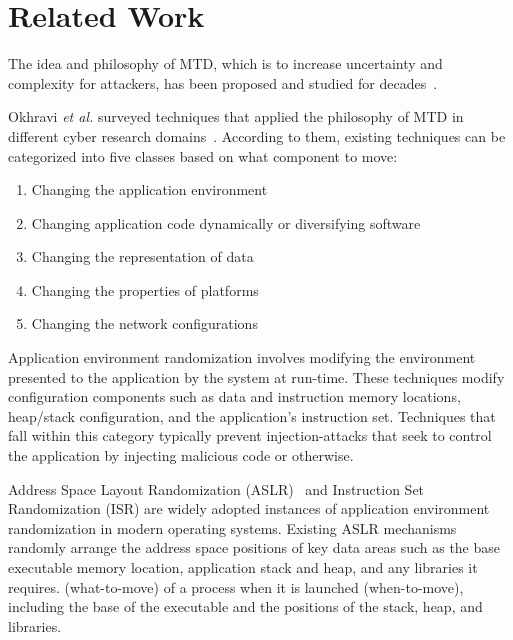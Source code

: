 \section{Related Work }
The idea and philosophy of MTD, which is to increase uncertainty and complexity for attackers, has been proposed and studied for decades~\cite{avizienis1977implementation,ammann1988data,pettis1990profile,forrest1997building}.

Okhravi \textit{et al.} surveyed techniques that applied the philosophy of MTD in different cyber research domains~\cite{okhravi2013survey}.
According to them, existing techniques can be categorized into five classes based on what component to move:
\begin{enumerate}
	\item Changing the application environment~\cite{team2003pax,barrantes2003randomized}
	\item Changing application code dynamically or diversifying software~\cite{wartell2012binary,larsen2014sok}
	\item Changing the representation of data~\cite{ammann1988data,nguyen2008security}
	\item Changing the properties of platforms~\cite{williams2009security,salamat2011runtime}
	\item Changing the network configurations~\cite{Zhuang2013investigating,ge2014toward,jafarian2014openflow}
\end{enumerate}

Application environment randomization involves modifying the environment presented to the application by the system at run-time. These techniques modify configuration components such as data and instruction memory locations, heap/stack configuration, and the application's instruction set. Techniques that fall within this category typically prevent injection-attacks that seek to control the application by injecting malicious code or otherwise. 

Address Space Layout Randomization (ASLR)~\cite{team2003pax} and Instruction Set Randomization (ISR) are widely adopted instances of application environment randomization in modern operating systems.
Existing ASLR mechanisms randomly arrange the address space positions of key data areas such as the base executable memory location, application stack and heap, and any libraries it requires. (what-to-move) of a process when it is launched (when-to-move), including the base of the executable and the positions of the stack, heap, and libraries.

